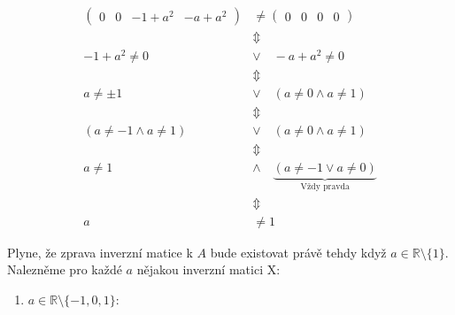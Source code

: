 \documentclass[12pt]{article}
\begin{document}
\begin{enumerate}
\begin{enumerate}
          \begin{align*}
            \left(\begin{array}{cccc}
              0&0&-1+a^2&-a+a^2
            \end{array}\right) &\neq \left(\begin{array}{cccc}
              0&0&0&0
            \end{array}\right) \\
            &\Updownarrow \\
            -1+a^2 \neq 0 \quad &\lor \quad -a + a^2 \neq 0 \\
            &\Updownarrow \\
            a \neq \pm1 \quad &\lor \quad \left(a \neq 0 \land a \neq 1\right) \\
            &\Updownarrow \\
            \left(a \neq -1 \land a \neq 1\right) \quad &\lor \quad \left(a \neq 0 \land a \neq 1\right) \\
            &\Updownarrow \\
            a \neq 1 \quad &\land \quad \underbrace{\left( a \neq -1 \lor a \neq 0 \right) }_{\text{Vždy pravda}} \\
            &\Updownarrow \\
            a &\neq 1
          \end{align*}

          Plyne, že zprava inverzní matice k $A$ bude existovat právě tehdy když $a \in \mathbb{R} \setminus \{1\}$.
          Nalezněme pro každé $a$ nějakou inverzní matici X:

          \begin{enumerate}
            \item $a\in\mathbb{R}\setminus\{-1,0,1\}$:


\end{enumerate}
\end{enumerate}
\end{enumerate}
\end{document}
